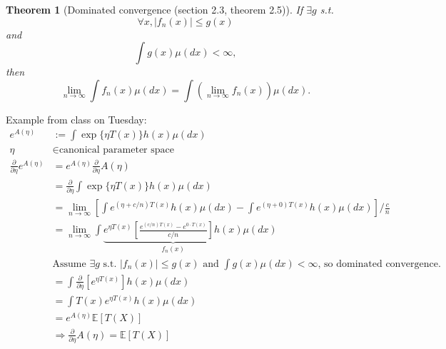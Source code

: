 \documentclass{article}
\newtheorem{thm}{Theorem}[section]
\newcommand{\E}{\mathbb{E}}
\begin{document}
\begin{thm}[Dominated convergence (section 2.3, theorem 2.5)]
  If $\exists g$ s.t. \[\forall x, |f_n(x)| \le g(x)\] and \[\int g(x) \mu(dx) <
  \infty,\] then \[\lim_{n \rightarrow \infty} \int f_n(x) \mu(dx) = \int
  \left(\lim_{n \rightarrow \infty} f_n(x) \right) \mu(dx).\]
\end{thm}

Example from class on Tuesday:
\begin{align*}
  e^{A(\eta)} &:= \int \exp\{\eta T(x) \} h(x) \mu(dx) \\
  \eta &\in \text{canonical parameter space} \\
  \frac{\partial}{\partial \eta} e^{A(\eta)} &= e^{A(\eta)}
  \frac{\partial}{\partial \eta}A(\eta) \\
  &= \frac{\partial}{\partial \eta} \int \exp\{\eta T(x) \} h(x) \mu(dx)\\
  &= \lim_{n \rightarrow \infty} \left[ \int e^{(\eta + c/n)T(x)} h(x) \mu(dx) -
  \int e^{(\eta + 0)T(x)} h(x) \mu(dx) \right]/ \frac{c}{n} \\
  &= \lim_{n \rightarrow \infty} \int \underbrace{e^{\eta T(x)} \left[
  \frac{e^{(c/n)T(x)} - e^{0 \cdot T(x)}}{c/n} \right] h(x)}_{f_n(x)} \mu(dx) \\
  & \text{Assume $\exists g$ s.t. $|f_n(x)| \le g(x)$ and $\int g(x) \mu(dx) <
  \infty$, so dominated convergence.} \\
  &= \int \frac{\partial}{\partial \eta} \left[e^{\eta T(x)}\right] h(x) \mu(dx) \\
  &= \int T(x) e^{\eta T(x)} h(x) \mu(dx)  \\
  &= e^{A(\eta)} \E[T(X)] \\
  &\Rightarrow \frac{\partial}{\partial \eta} A(\eta) = \E[T(X)]
\end{align*}
\end{document}
